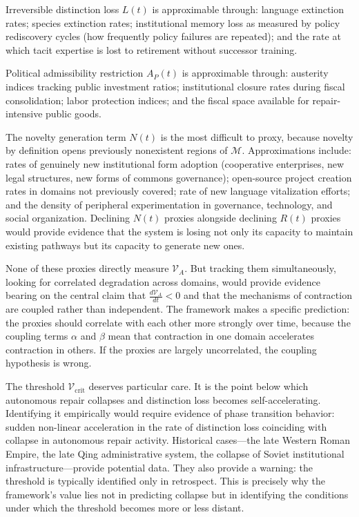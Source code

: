 \documentclass[11pt, letterpaper]{article}
\begin{document}
Irreversible distinction loss $L(t)$ is approximable through: language extinction rates; species extinction rates; institutional memory loss as measured by policy rediscovery cycles (how frequently policy failures are repeated); and the rate at which tacit expertise is lost to retirement without successor training.

Political admissibility restriction $A_P(t)$ is approximable through: austerity indices tracking public investment ratios; institutional closure rates during fiscal consolidation; labor protection indices; and the fiscal space available for repair-intensive public goods.

The novelty generation term $N(t)$ is the most difficult to proxy, because novelty by definition opens previously nonexistent regions of $\mathcal{M}$. Approximations include: rates of genuinely new institutional form adoption (cooperative enterprises, new legal structures, new forms of commons governance); open-source project creation rates in domains not previously covered; rate of new language vitalization efforts; and the density of peripheral experimentation in governance, technology, and social organization. Declining $N(t)$ proxies alongside declining $R(t)$ proxies would provide evidence that the system is losing not only its capacity to maintain existing pathways but its capacity to generate new ones.

None of these proxies directly measure $\mathcal{V}_A$. But tracking them simultaneously, looking for correlated degradation across domains, would provide evidence bearing on the central claim that $\frac{d\mathcal{V}_A}{dt} < 0$ and that the mechanisms of contraction are coupled rather than independent. The framework makes a specific prediction: the proxies should correlate with each other more strongly over time, because the coupling terms $\alpha$ and $\beta$ mean that contraction in one domain accelerates contraction in others. If the proxies are largely uncorrelated, the coupling hypothesis is wrong.

The threshold $\mathcal{V}_{\text{crit}}$ deserves particular care. It is the point below which autonomous repair collapses and distinction loss becomes self-accelerating. Identifying it empirically would require evidence of phase transition behavior: sudden non-linear acceleration in the rate of distinction loss coinciding with collapse in autonomous repair activity. Historical cases---the late Western Roman Empire, the late Qing administrative system, the collapse of Soviet institutional infrastructure---provide potential data. They also provide a warning: the threshold is typically identified only in retrospect. This is precisely why the framework's value lies not in predicting collapse but in identifying the conditions under which the threshold becomes more or less distant.
\end{document}

